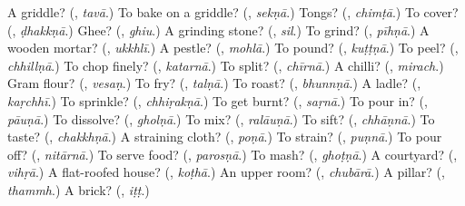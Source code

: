 \begin{tcolorbox}[breakable,colback=teal!4,colframe=teal!35!black,title={Before you move on}]
A griddle? (\textbf{}, \emph{tavā}.) To bake on a griddle? (\textbf{}, \emph{sekṇā}.) Tongs? (\textbf{}, \emph{chimṭā}.) To cover? (\textbf{}, \emph{ḍhakkṇā}.) Ghee? (\textbf{}, \emph{ghiu}.) A grinding stone? (\textbf{}, \emph{sil}.) To grind? (\textbf{}, \emph{pīhṇā}.) A wooden mortar? (\textbf{}, \emph{ukkhlī}.) A pestle? (\textbf{}, \emph{mohlā}.) To pound? (\textbf{}, \emph{kuṭṭṇā}.) To peel? (\textbf{}, \emph{chhillṇā}.) To chop finely? (\textbf{}, \emph{katarnā}.) To split? (\textbf{}, \emph{chīrnā}.) A chilli? (\textbf{}, \emph{mirach}.) Gram flour? (\textbf{}, \emph{vesaṇ}.) To fry? (\textbf{}, \emph{talṇā}.) To roast? (\textbf{}, \emph{bhunnṇā}.) A ladle? (\textbf{}, \emph{kaṛchhī}.) To sprinkle? (\textbf{}, \emph{chhiṛakṇā}.) To get burnt? (\textbf{}, \emph{saṛnā}.) To pour in? (\textbf{}, \emph{pāuṇā}.) To dissolve? (\textbf{}, \emph{gholṇā}.) To mix? (\textbf{}, \emph{ralāuṇā}.) To sift? (\textbf{}, \emph{chhāṇnā}.) To taste? (\textbf{}, \emph{chakkhṇā}.) A straining cloth? (\textbf{}, \emph{poṇā}.) To strain? (\textbf{}, \emph{puṇnā}.) To pour off? (\textbf{}, \emph{nitārnā}.) To serve food? (\textbf{}, \emph{parosṇā}.) To mash? (\textbf{}, \emph{ghoṭṇā}.) A courtyard? (\textbf{}, \emph{vihṛā}.) A flat-roofed house? (\textbf{}, \emph{koṭhā}.) An upper room? (\textbf{}, \emph{chubārā}.) A pillar? (\textbf{}, \emph{thammh}.) A brick? (\textbf{}, \emph{iṭṭ}.)
\end{tcolorbox}

